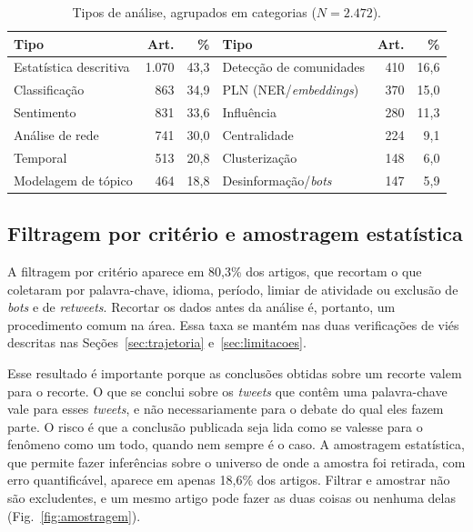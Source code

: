 \documentclass[11pt,a4paper]{article}
\begin{document}
\begin{table}[H]
\centering
\caption{Tipos de análise, agrupados em categorias ($N=2.472$).}
\label{tab:analises}
\begin{tabular}{lrr@{\hspace{2em}}lrr}
\toprule
Tipo & Art. & \% & Tipo & Art. & \% \\ \midrule
Estatística descritiva & 1.070 & 43,3 & Detecção de comunidades & 410 & 16,6 \\
Classificação          &   863 & 34,9 & PLN (NER/\textit{embeddings}) & 370 & 15,0 \\
Sentimento             &   831 & 33,6 & Influência            & 280 & 11,3 \\
Análise de rede        &   741 & 30,0 & Centralidade          & 224 & 9,1 \\
Temporal               &   513 & 20,8 & Clusterização         & 148 & 6,0 \\
Modelagem de tópico    &   464 & 18,8 & Desinformação/\textit{bots} & 147 & 5,9 \\
\bottomrule
\end{tabular}
\end{table}

\subsection{Filtragem por critério e amostragem estatística}
\label{sec:achado}

A filtragem por critério aparece em 80,3\% dos artigos, que recortam o que
coletaram por palavra-chave, idioma, período, limiar de atividade ou exclusão
de \textit{bots} e de \textit{retweets}. Recortar os dados antes da análise é,
portanto, um procedimento comum na área.
Essa taxa se mantém nas duas verificações de viés descritas nas
Seções~\ref{sec:trajetoria} e~\ref{sec:limitacoes}.

Esse resultado é importante porque as conclusões obtidas sobre um recorte valem
para o recorte. O que se conclui sobre os \textit{tweets} que contêm uma
palavra-chave vale para esses \textit{tweets}, e não necessariamente para o
debate do qual eles fazem parte. O risco é que a conclusão publicada seja lida
como se valesse para o fenômeno como um todo, quando nem sempre é o caso. A
amostragem estatística, que permite fazer inferências sobre o universo de onde
a amostra foi retirada, com erro quantificável, aparece em apenas 18,6\% dos
artigos. Filtrar e amostrar não são excludentes, e um mesmo artigo pode fazer
as duas coisas ou nenhuma delas (Fig.~\ref{fig:amostragem}).
\end{document}
